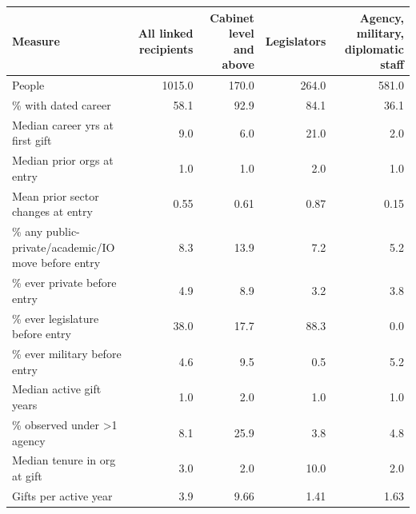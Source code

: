 \begin{tabular}{lrrrr}
\toprule
Measure & All linked recipients & Cabinet level and above & Legislators & Agency, military, diplomatic staff \\
\midrule
People & 1015.0 & 170.0 & 264.0 & 581.0 \\
\% with dated career & 58.1 & 92.9 & 84.1 & 36.1 \\
Median career yrs at first gift & 9.0 & 6.0 & 21.0 & 2.0 \\
Median prior orgs at entry & 1.0 & 1.0 & 2.0 & 1.0 \\
Mean prior sector changes at entry & 0.55 & 0.61 & 0.87 & 0.15 \\
\% any public-private/academic/IO move before entry & 8.3 & 13.9 & 7.2 & 5.2 \\
\% ever private before entry & 4.9 & 8.9 & 3.2 & 3.8 \\
\% ever legislature before entry & 38.0 & 17.7 & 88.3 & 0.0 \\
\% ever military before entry & 4.6 & 9.5 & 0.5 & 5.2 \\
Median active gift years & 1.0 & 2.0 & 1.0 & 1.0 \\
\% observed under >1 agency & 8.1 & 25.9 & 3.8 & 4.8 \\
Median tenure in org at gift & 3.0 & 2.0 & 10.0 & 2.0 \\
Gifts per active year & 3.9 & 9.66 & 1.41 & 1.63 \\
\bottomrule
\end{tabular}
\par{}
